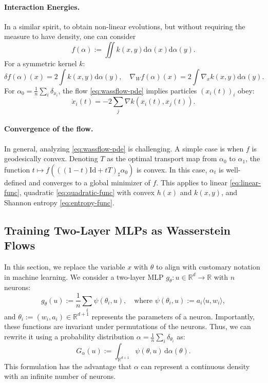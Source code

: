\paragraph{Interaction Energies.} In a similar spirit, to obtain non-linear evolutions, but without requiring the measure to have density, one can consider
   \begin{equation}
       f(\alpha) := \iint k(x, y) \mathrm{d} \alpha(x) \mathrm{d} \alpha(y). \label{eq:quadratic-func}
   \end{equation}
   For a symmetric kernel $k$:
   \begin{equation*}
       \delta f(\alpha)(x) = 2 \int k(x, y) \mathrm{d} \alpha(y), \quad \nabla_W f(\alpha)(x) = 2 \int \nabla_x k(x, y) \mathrm{d} \alpha(y).
   \end{equation*}
   For $\alpha_0 = \frac{1}{n} \sum_i \delta_{x_i}$, the flow \eqref{eq:wassflow-pde} implies particles $(x_i(t))_i$ obey:
   \begin{equation*}
       \dot{x}_i(t) = -2 \sum_j \nabla k(x_i(t), x_j(t)).
   \end{equation*}
   
\paragraph{Convergence of the flow.}
In general, analyzing \eqref{eq:wassflow-pde} is challenging. A simple case is when $f$ is geodesically convex. Denoting $T$ as the optimal transport map from $\alpha_0$ to $\alpha_1$, the function $t \mapsto f(((1-t)\mathrm{Id} + tT)_\sharp \alpha_0)$ is convex. In this case, $\alpha_t$ is well-defined and converges to a global minimizer of $f$. This applies to linear \eqref{eq:linear-func}, quadratic \eqref{eq:quadratic-func} with convex $h(x)$ and $k(x, y)$, and Shannon entropy \eqref{eq:entropy-func}.


\subsection{Training Two-Layer MLPs as Wasserstein Flows}

In this section, we replace the variable $x$ with $\theta$ to align with customary notation in machine learning. 
%
We consider a two-layer MLP $g_\theta : u \in \mathbb{R}^d \to \mathbb{R}$ with $n$ neurons:
\begin{equation*}
    g_\theta(u) := \frac{1}{n} \sum_i \psi(\theta_i, u), \quad \text{where } \psi(\theta_i, u) := a_i \langle u, w_i \rangle,
\end{equation*}
and $\theta_i := (w_i, a_i) \in \mathbb{R}^{d+1}$ represents the parameters of a neuron. Importantly, these functions are invariant under permutations of the neurons. Thus, we can rewrite it using a probability distribution $\alpha = \frac{1}{n} \sum_i \delta_{\theta_i}$ as:
\begin{equation*}
    G_\alpha(u) := \int_{\mathbb{R}^{d+1}} \psi(\theta, u) \, \mathrm{d} \alpha(\theta).
\end{equation*}
This formulation has the advantage that $\alpha$ can represent a continuous density with an infinite number of neurons.

